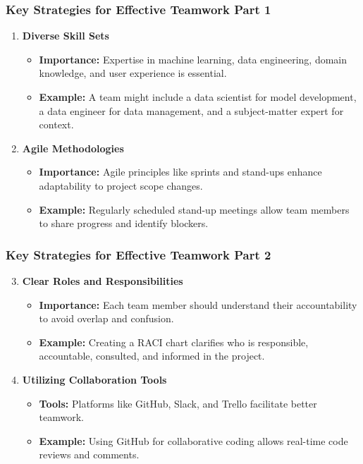 \documentclass{beamer}
\begin{document}
\begin{frame}[fragile]
    \frametitle{Key Strategies for Effective Teamwork Part 1}
    \begin{enumerate}
        \item \textbf{Diverse Skill Sets}
        \begin{itemize}
            \item \textbf{Importance:} Expertise in machine learning, data engineering, domain knowledge, and user experience is essential.
            \item \textbf{Example:} A team might include a data scientist for model development, a data engineer for data management, and a subject-matter expert for context.
        \end{itemize}
        
        \item \textbf{Agile Methodologies}
        \begin{itemize}
            \item \textbf{Importance:} Agile principles like sprints and stand-ups enhance adaptability to project scope changes.
            \item \textbf{Example:} Regularly scheduled stand-up meetings allow team members to share progress and identify blockers.
        \end{itemize}
    \end{enumerate}
\end{frame}

\begin{frame}[fragile]
    \frametitle{Key Strategies for Effective Teamwork Part 2}
    \begin{enumerate}
        \setcounter{enumi}{2} %
        \item \textbf{Clear Roles and Responsibilities}
        \begin{itemize}
            \item \textbf{Importance:} Each team member should understand their accountability to avoid overlap and confusion.
            \item \textbf{Example:} Creating a RACI chart clarifies who is responsible, accountable, consulted, and informed in the project.
        \end{itemize}
        
        \item \textbf{Utilizing Collaboration Tools}
        \begin{itemize}
            \item \textbf{Tools:} Platforms like GitHub, Slack, and Trello facilitate better teamwork.
            \item \textbf{Example:} Using GitHub for collaborative coding allows real-time code reviews and comments.
        \end{itemize}
    \end{enumerate}
\end{frame}
\end{document}
